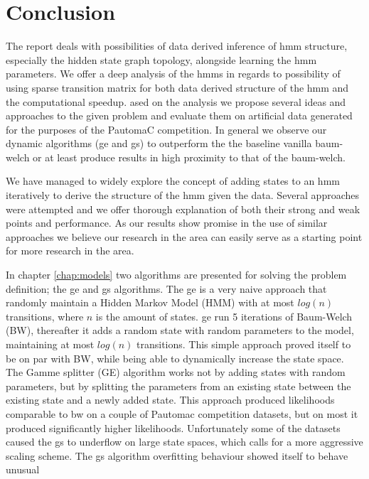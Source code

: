 \chapter{Conclusion}
\label{chap:conclusion}
The report deals with possibilities of data derived inference of \gls{hmm} structure, especially the hidden state graph topology, alongside learning the \gls{hmm} parameters. We offer a deep analysis of the \glspl{hmm} in regards to possibility of using sparse transition matrix for both data derived structure of the \gls{hmm} and the computational  speedup. ased on the analysis we propose several ideas and approaches to the given problem and evaluate them on artificial data generated for the purposes of the PautomaC competition. In general we observe our dynamic algorithms (\acrfull{ge} and \acrfull{gs}) to outperform the the baseline vanilla \gls{baum-welch} or at least produce results in high proximity to that of the \gls{baum-welch}.

We have managed to widely explore the concept of adding states to an \gls{hmm} iteratively to derive the structure of the \gls{hmm} given the data. Several approaches were attempted and we offer thorough explanation of both their strong and weak points and performance. As our results show promise in the use of similar approaches we believe our research in the area can easily serve as a starting point for more research in the area.



In chapter \ref{chap:models} two algorithms are presented for solving the problem definition; the \acrfull{ge} and \acrfull{gs} algorithms. The \gls{ge} is a very naive approach that randomly maintain a Hidden Markov Model (HMM) with at most $log(n)$ transitions, where $n$ is the amount of states. \gls{ge} run 5 iterations of Baum-Welch (BW), thereafter it adds a random state with random parameters to the model, maintaining at most $log(n)$ transitions. This simple approach proved itself to be on par with BW, while being able to dynamically increase the state space. The Gamme splitter (GE) algorithm works not by adding states with random parameters, but by splitting the parameters from an existing state between the existing state and a newly added state. This approach produced likelihoods comparable to \gls{bw} on a couple of Pautomac competition datasets, but on most it produced significantly higher likelihoods. Unfortunately some of the datasets caused the \gls{gs} to underflow on large state spaces, which calls for a more aggressive scaling scheme.
The \gls{gs} algorithm overfitting behaviour showed itself to behave unusual
